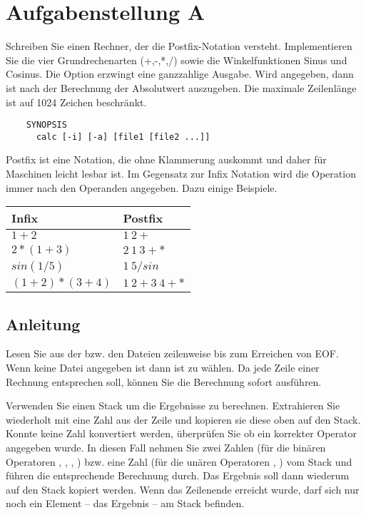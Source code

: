 




\section*{Aufgabenstellung A}
Schreiben Sie einen Rechner, der die Postfix-Notation versteht. 
Implementieren Sie die vier Grundrechenarten (+,-,*,/) sowie die Winkelfunktionen Sinus und Cosinus. 
Die Option  erzwingt eine ganzzahlige Ausgabe. Wird  angegeben, 
dann ist nach der Berechnung der Absolutwert auszugeben. Die maximale Zeilenlänge ist auf 1024 Zeichen beschränkt.

\begin{verbatim}
	SYNOPSIS
	  calc [-i] [-a] [file1 [file2 ...]]
\end{verbatim}

Postfix ist eine Notation, die ohne Klammerung auskommt und daher für Maschinen leicht lesbar ist. Im Gegensatz zur Infix Notation wird die Operation immer nach den Operanden angegeben. Dazu einige Beispiele.

\begin{tabular}{ll}
\hline
Infix & Postfix \\ \hline
$1+2$ & $1\:2 + $ \\
$2*(1+3)$ & $2\:1\:3 + * $ \\
$sin(1/5)$ & $1\:5 / sin $ \\ 
$(1+2)*(3+4)$ & $1\:2 + 3\:4 + *$ \\
\hline
\end{tabular}

\subsection*{Anleitung}
Lesen Sie aus der bzw. den Dateien zeilenweise bis zum Erreichen von EOF. Wenn keine Datei angegeben ist dann ist  zu wählen.
Da jede Zeile einer Rechnung entsprechen soll, können Sie die Berechnung sofort ausführen.

Verwenden Sie einen Stack um die Ergebnisse zu berechnen. 
Extrahieren Sie wiederholt mit  eine Zahl aus der Zeile und kopieren sie diese oben auf den Stack. Konnte keine Zahl konvertiert werden, überprüfen Sie ob ein korrekter Operator angegeben wurde. In diesen Fall nehmen Sie zwei Zahlen (für die binären Operatoren \osueinput{+}, \osueinput{-}, \osueinput{/}, \osueinput{*}) bzw. eine Zahl (für die unären Operatoren , ) vom Stack und führen die entsprechende Berechnung durch. Das Ergebnis soll dann wiederum auf den Stack kopiert werden.
Wenn das Zeilenende erreicht wurde, darf sich nur noch ein Element -- das Ergebnis -- am Stack befinden.   

